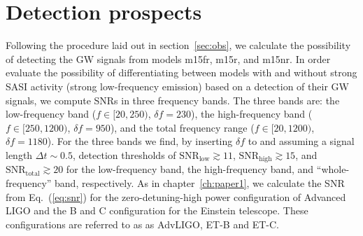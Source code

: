 \section{Detection prospects}
Following the procedure laid out in section~\ref{sec:obs}, we calculate the possibility of detecting the GW signals from models m15fr, m15r, and m15nr.
In order evaluate the possibility of differentiating between models with and without strong SASI activity (strong low-frequency emission)
based on a detection of their GW signals, we compute SNRs in three frequency bands.
The three bands are: the low-frequency band ($f \in [20,250)$, $\delta f= 230$), the
high-frequency band ($f \in [250,1200)$, $\delta f= 950$), and the total frequency range
($f \in [20,1200)$,  $\delta f= 1180$).
For the three bands we find, by inserting $\delta f$ to  and assuming a
signal length $\Delta t \sim 0.5$, detection thresholds of $\mathrm{SNR}_\mathrm{low} \gtrsim 11$, 
$\mathrm{SNR}_\mathrm{high} \gtrsim 15$, and $\mathrm{SNR}_\mathrm{total} \gtrsim 20$ for the
low-frequency band, the high-frequency band, and ``whole-frequency'' band, respectively.
As in chapter~\ref{ch:paper1}, we calculate the SNR from Eq.~(\ref{eq:snr}) for the zero-detuning-high power configuration
of Advanced LIGO \citep{adv_sens} and the B \citep{et_b} and C \citep{et_c} configuration for the Einstein
telescope. These configurations are referred to as as AdvLIGO, ET-B and ET-C.
